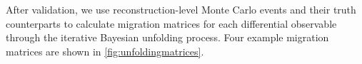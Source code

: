After validation, we use reconstruction-level Monte Carlo events and their truth counterparts to calculate migration matrices for each differential observable through the iterative Bayesian unfolding process. Four example migration matrices are shown in \ref{fig:unfoldingmatrices}. 

\begin{figure}[!h]
\centering
\centering
  \hfill
  \hfill
  \hfill
\end{figure}
